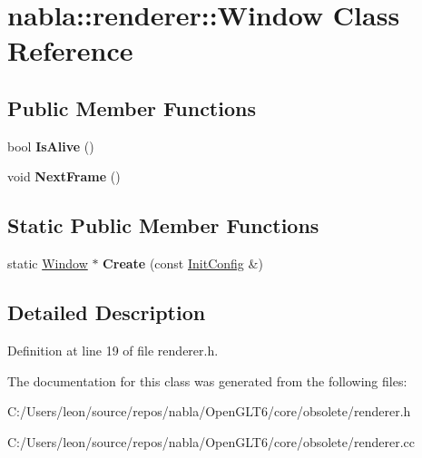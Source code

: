 \hypertarget{classnabla_1_1renderer_1_1_window}{}\section{nabla\+::renderer\+::Window Class Reference}
\label{classnabla_1_1renderer_1_1_window}
\subsection*{Public Member Functions}
\begin{DoxyCompactItemize}
\item 
\mbox{\label{classnabla_1_1renderer_1_1_window_aac292b20dba6d005eebf0da33048e005}} 
bool {\bfseries Is\+Alive} ()
\item 
\mbox{\label{classnabla_1_1renderer_1_1_window_ae1f5cf28387cf2ed2501d845ddb54818}} 
void {\bfseries Next\+Frame} ()
\end{DoxyCompactItemize}
\subsection*{Static Public Member Functions}
\begin{DoxyCompactItemize}
\item 
\mbox{\label{classnabla_1_1renderer_1_1_window_acc4b55396a6ccf3d57abfc844f492323}} 
static \mbox{\hyperlink{classnabla_1_1renderer_1_1_window}{Window}} $\ast$ {\bfseries Create} (const \mbox{\hyperlink{structnabla_1_1renderer_1_1_init_config}{Init\+Config}} \&)
\end{DoxyCompactItemize}


\subsection{Detailed Description}


Definition at line 19 of file renderer.\+h.



The documentation for this class was generated from the following files\+:\begin{DoxyCompactItemize}
\item 
C\+:/\+Users/leon/source/repos/nabla/\+Open\+G\+L\+T6/core/obsolete/renderer.\+h\item 
C\+:/\+Users/leon/source/repos/nabla/\+Open\+G\+L\+T6/core/obsolete/renderer.\+cc\end{DoxyCompactItemize}

